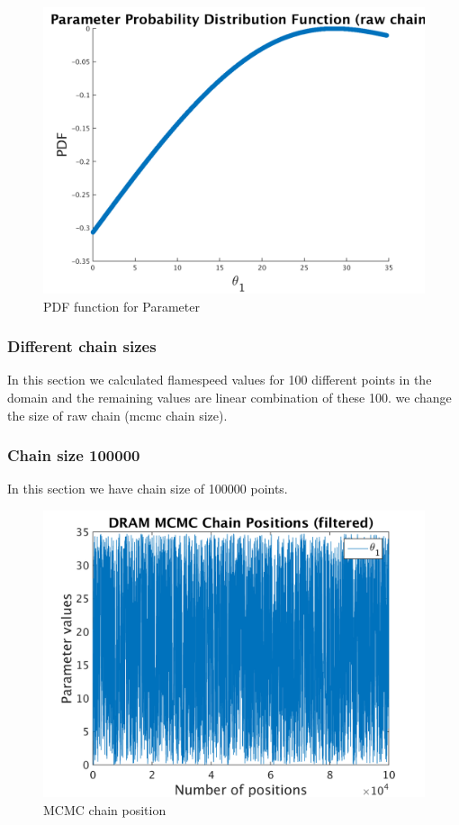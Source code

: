 \begin{figure}[h!]
  
  \centering
   \includegraphics[scale=0.75]{output_1000/ip_logLike_unified}
   \caption{PDF function for Parameter }
\end{figure}


\subsubsection{Different chain sizes }

In this section we calculated flamespeed values for 100 different points in the domain and the remaining values are linear combination of these 100. we change the size of raw chain (mcmc chain size). 

\subsubsection{Chain size 100000 }

In this section we have chain size of 100000 points. 

\begin{figure}[h!]
  
  \centering
   \includegraphics[scale=0.75]{output_100000/simple_ip_chain_pos_filt}
   \caption{MCMC chain position }
\end{figure}


